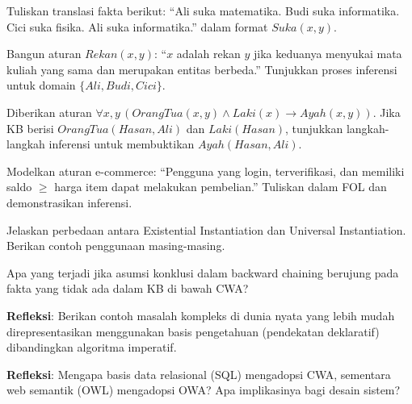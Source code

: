 \documentclass[../main]{subfiles}
\begin{document}

\begin{latihan}
  \item Tuliskan translasi fakta berikut: ``Ali suka matematika. Budi suka informatika. Cici suka fisika. Ali suka informatika.'' dalam format $Suka(x, y)$.
  \item Bangun aturan $Rekan(x, y)$: ``$x$ adalah rekan $y$ jika keduanya menyukai mata kuliah yang sama dan merupakan entitas berbeda.'' Tunjukkan proses inferensi untuk domain $\{Ali, Budi, Cici\}$.
  \item Diberikan aturan $\forall x, y\, (OrangTua(x, y) \wedge Laki(x) \rightarrow Ayah(x, y))$. Jika KB berisi $OrangTua(Hasan, Ali)$ dan $Laki(Hasan)$, tunjukkan langkah-langkah inferensi untuk membuktikan $Ayah(Hasan, Ali)$.
  \item Modelkan aturan e-commerce: ``Pengguna yang login, terverifikasi, dan memiliki saldo $\geq$ harga item dapat melakukan pembelian.'' Tuliskan dalam FOL dan demonstrasikan inferensi.
  \item Jelaskan perbedaan antara Existential Instantiation dan Universal Instantiation. Berikan contoh penggunaan masing-masing.
  \item Apa yang terjadi jika asumsi konklusi dalam backward chaining berujung pada fakta yang tidak ada dalam KB di bawah CWA?
  \item \textbf{Refleksi}: Berikan contoh masalah kompleks di dunia nyata yang lebih mudah direpresentasikan menggunakan basis pengetahuan (pendekatan deklaratif) dibandingkan algoritma imperatif.
  \item \textbf{Refleksi}: Mengapa basis data relasional (SQL) mengadopsi CWA, sementara web semantik (OWL) mengadopsi OWA? Apa implikasinya bagi desain sistem?
\end{latihan}

\end{document}
